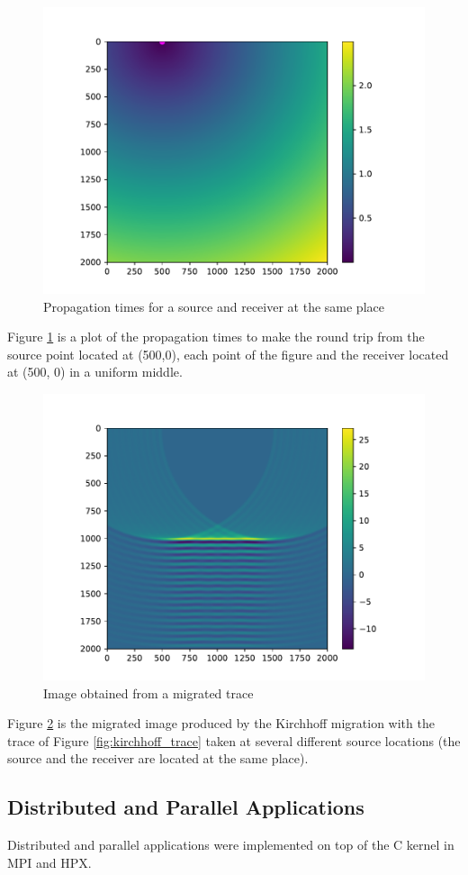 \begin{figure}[H]
	\centering
	\includegraphics[width=.7\textwidth]{traceppt.pdf}
	\caption{Propagation times for a source and receiver at the same place\label{fig:kirchhoff_pt}}
\end{figure}

Figure \ref{fig:kirchhoff_pt} is a plot of the propagation times to make the round trip from the source point located at (500,0), each point of the figure and the receiver located at (500, 0) in a uniform middle.

\begin{figure}[H]
	\centering
	\includegraphics[width=.7\textwidth]{img.pdf}
	\caption{Image obtained from a migrated trace\label{fig:kirchhoff_image}}
\end{figure}
Figure \ref{fig:kirchhoff_image} is the migrated image produced by the Kirchhoff migration with the trace of Figure \ref{fig:kirchhoff_trace} taken at several different source locations (the source and the receiver are located at the same place).

\subsection{Distributed and Parallel Applications}
Distributed and parallel applications were implemented on top of the C kernel in MPI and HPX.

